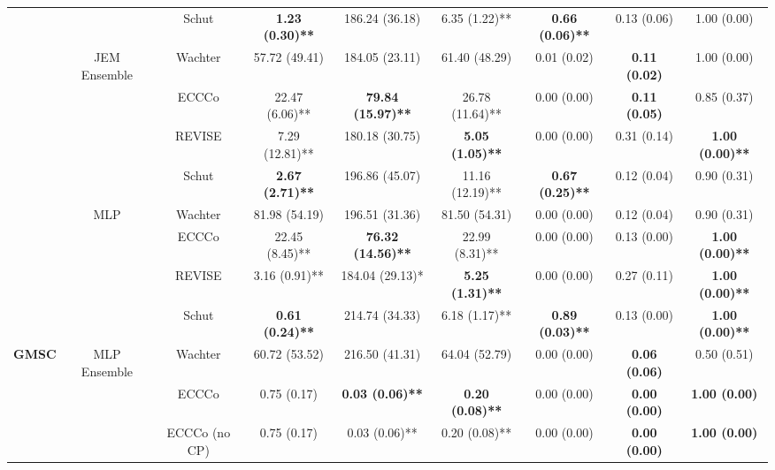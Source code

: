 \begin{table}
{\begin{tabular}[t]{>{}c|c|c|c|c|c|c|c|c}
 &  & Schut & \textbf{1.23 (0.30)**} & 186.24 (36.18) & 6.35 (1.22)** & \textbf{0.66 (0.06)**} & 0.13 (0.06) & 1.00 (0.00)\\

 & \multirow{-4}{*}{\centering\arraybackslash JEM Ensemble} & Wachter & 57.72 (49.41) & 184.05 (23.11) & 61.40 (48.29) & 0.01 (0.02) & \textbf{0.11 (0.02)} & 1.00 (0.00)\\
\cline{2-9}
 &  & ECCCo & 22.47 (6.06)** & \textbf{79.84 (15.97)**} & 26.78 (11.64)** & 0.00 (0.00) & \textbf{0.11 (0.05)} & 0.85 (0.37)\\

 &  & REVISE & 7.29 (12.81)** & 180.18 (30.75) & \textbf{5.05 (1.05)**} & 0.00 (0.00) & 0.31 (0.14) & \textbf{1.00 (0.00)**}\\

 &  & Schut & \textbf{2.67 (2.71)**} & 196.86 (45.07) & 11.16 (12.19)** & \textbf{0.67 (0.25)**} & 0.12 (0.04) & 0.90 (0.31)\\

 & \multirow{-4}{*}{\centering\arraybackslash MLP} & Wachter & 81.98 (54.19) & 196.51 (31.36) & 81.50 (54.31) & 0.00 (0.00) & 0.12 (0.04) & 0.90 (0.31)\\
\cline{2-9}
 &  & ECCCo & 22.45 (8.45)** & \textbf{76.32 (14.56)**} & 22.99 (8.31)** & 0.00 (0.00) & 0.13 (0.00) & \textbf{1.00 (0.00)**}\\

 &  & REVISE & 3.16 (0.91)** & 184.04 (29.13)* & \textbf{5.25 (1.31)**} & 0.00 (0.00) & 0.27 (0.11) & \textbf{1.00 (0.00)**}\\

 &  & Schut & \textbf{0.61 (0.24)**} & 214.74 (34.33) & 6.18 (1.17)** & \textbf{0.89 (0.03)**} & 0.13 (0.00) & \textbf{1.00 (0.00)**}\\

\multirow{-16}{*}{\centering\arraybackslash \textbf{GMSC}} & \multirow{-4}{*}{\centering\arraybackslash MLP Ensemble} & Wachter & 60.72 (53.52) & 216.50 (41.31) & 64.04 (52.79) & 0.00 (0.00) & \textbf{0.06 (0.06)} & 0.50 (0.51)\\
\cline{1-9}
 &  & ECCCo & 0.75 (0.17) & \textbf{0.03 (0.06)**} & \textbf{0.20 (0.08)**} & 0.00 (0.00) & \textbf{0.00 (0.00)} & \textbf{1.00 (0.00)}\\

 &  & ECCCo (no CP) & 0.75 (0.17) & 0.03 (0.06)** & 0.20 (0.08)** & 0.00 (0.00) & \textbf{0.00 (0.00)} & \textbf{1.00 (0.00)}\\


\end{tabular}}
\end{table}
